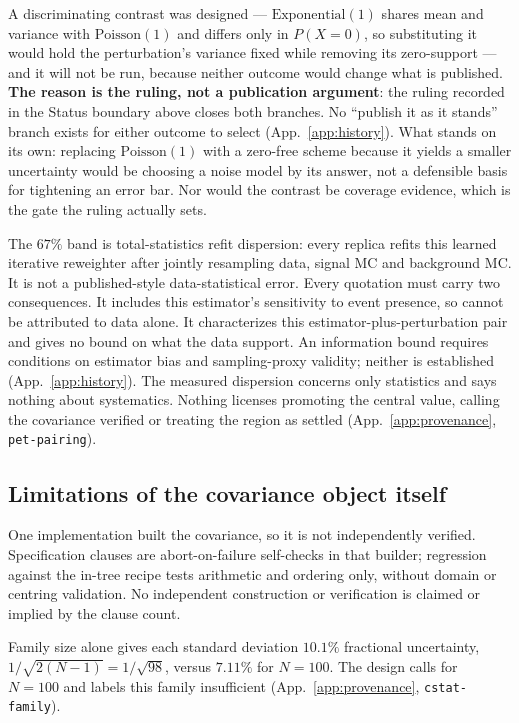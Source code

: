 A discriminating contrast was designed --- $\mathrm{Exponential}(1)$ shares mean and variance with $\mathrm{Poisson}(1)$ and differs only in $P(X{=}0)$, so substituting it would hold the perturbation's variance fixed while removing its zero-support --- and it will not be run, because neither outcome would change what is published. \textbf{The reason is the ruling, not a publication argument}: the ruling recorded in the Status boundary above closes both branches. No ``publish it as it stands'' branch exists for either outcome to select (App.~\ref{app:history}). What stands on its own: replacing $\mathrm{Poisson}(1)$ with a zero-free scheme because it yields a smaller uncertainty would be choosing a noise model by its answer, not a defensible basis for tightening an error bar. Nor would the contrast be coverage evidence, which is the gate the ruling actually sets.

The $67\%$ band is total-statistics refit dispersion: every replica refits this learned iterative reweighter after jointly resampling data, signal MC and background MC. It is not a published-style data-statistical error. Every quotation must carry two consequences. It includes this estimator's sensitivity to event presence, so cannot be attributed to data alone. It characterizes this estimator-plus-perturbation pair and gives no bound on what the data support. An information bound requires conditions on estimator bias and sampling-proxy validity; neither is established (App.~\ref{app:history}). The measured dispersion concerns only statistics and says nothing about systematics. Nothing licenses promoting the central value, calling the covariance verified or treating the region as settled (App.~\ref{app:provenance}, \texttt{pet-pairing}).

\subsection{Limitations of the covariance object itself}

One implementation built the covariance, so it is not independently verified. Specification clauses are abort-on-failure self-checks in that builder; regression against the in-tree recipe tests arithmetic and ordering only, without domain or centring validation. No independent construction or verification is claimed or implied by the clause count.

Family size alone gives each standard deviation $10.1\%$ fractional uncertainty, $1/\sqrt{2(N-1)}=1/\sqrt{98}$, versus $7.11\%$ for $N=100$. The design calls for $N=100$ and labels this family insufficient (App.~\ref{app:provenance}, \texttt{cstat-family}).

